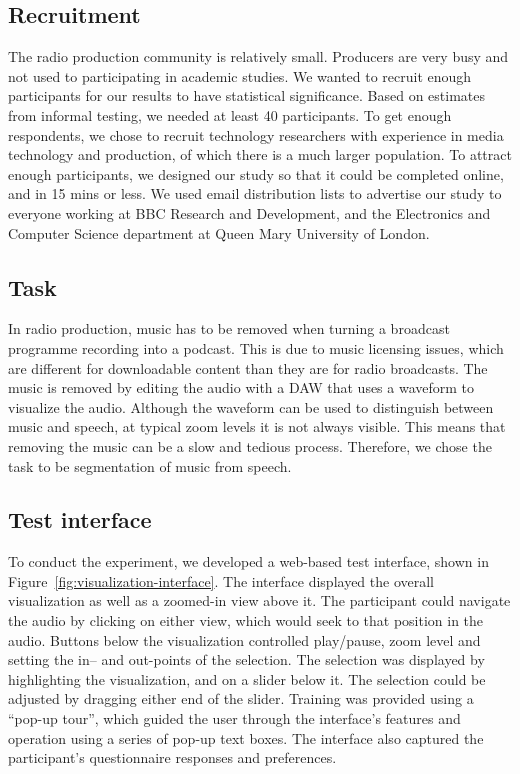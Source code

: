 \subsection{Recruitment}
The radio production community is relatively small. Producers are very busy and not used to participating in academic
studies.  We wanted to recruit enough participants for our results to have statistical significance. Based on estimates
from informal testing, we needed at least 40 participants.  To get enough respondents, we chose to recruit technology
researchers with experience in media technology and production, of which there is a much larger population.  To attract
enough participants, we designed our study so that it could be completed online, and in 15 mins or less.  We used email
distribution lists to advertise our study to everyone working at BBC Research and Development, and the Electronics and
Computer Science department at Queen Mary University of London.

\subsection{Task}
In radio production, music has to be removed when turning a broadcast programme recording into a podcast. This is due
to music licensing issues, which are different for downloadable content than they are for radio broadcasts. The music
is removed by editing the audio with a DAW that uses a waveform to visualize the audio. Although the waveform can be
used to distinguish between music and speech, at typical zoom levels it is not always visible. This means that removing
the music can be a slow and tedious process. Therefore, we chose the task to be segmentation of music from speech.

\subsection{Test interface}

To conduct the experiment, we developed a web-based test interface, shown in Figure~\ref{fig:visualization-interface}.
The interface displayed the overall visualization as well as a zoomed-in view above it. The participant could navigate
the audio by clicking on either view, which would seek to that position in the audio.  Buttons below the visualization
controlled play/pause, zoom level and setting the in-- and out-points of the selection.  The selection was displayed by
highlighting the visualization, and on a slider below it. The selection could be adjusted by dragging either end of the
slider.  Training was provided using a ``pop-up tour'', which guided the user through the interface's features and
operation using a series of pop-up text boxes.  The interface also captured the participant's questionnaire responses
and preferences.

